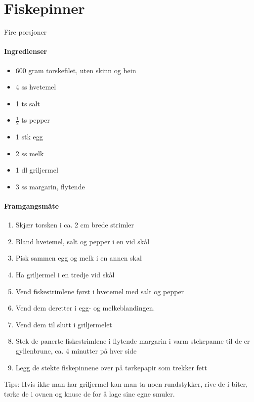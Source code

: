\section{﻿Fiskepinner}
Fire porsjoner

\paragraph{Ingredienser}
\begin{itemize}[noitemsep]
	\item 600 gram  torskefilet, uten skinn og bein
	\item 4 ss hvetemel
	\item 1 ts salt
	\item $\frac{1}{2}$  ts pepper
	\item 1 stk egg
	\item 2 ss melk
	\item 1 dl griljermel
	\item 3 ss margarin, flytende
\end{itemize}


\paragraph{Framgangsmåte}
\begin{enumerate}[noitemsep]
	\item Skjær torsken i ca. 2 cm brede strimler
	\item Bland hvetemel, salt og pepper i en vid skål
	\item Pisk sammen egg og melk i en annen skal
	\item Ha griljermel i en tredje vid skål
	\item Vend fiskestrimlene først i hvetemel med salt og pepper
	\item Vend dem deretter i egg- og melkeblandingen.
	\item Vend dem til slutt i griljermelet
	\item Stek de panerte fiskestrimlene i flytende margarin i varm stekepanne til de er gyllenbrune, ca. 4 minutter på hver side
	\item Legg de stekte fiskepinnene over på tørkepapir som trekker fett
\end{enumerate}

Tips: Hvis ikke man har griljermel kan man ta noen rundstykker, rive de i biter, tørke de i ovnen og knuse de for å lage sine egne smuler.
